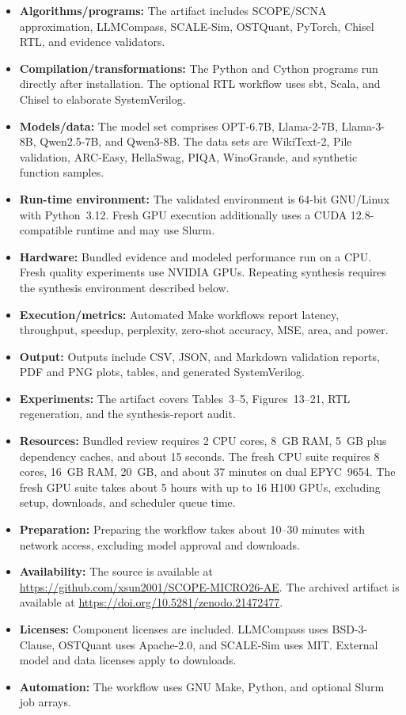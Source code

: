 \documentclass{sigplanconf}
\begin{document}
\begin{itemize}[leftmargin=*]
  \item \textbf{Algorithms/programs:} The artifact includes SCOPE/SCNA
    approximation, LLMCompass, SCALE-Sim, OSTQuant, PyTorch, Chisel RTL, and
    evidence validators.
  \item \textbf{Compilation/transformations:} The Python and Cython programs
    run directly after installation.  The optional RTL workflow uses sbt,
    Scala, and Chisel to elaborate SystemVerilog.
  \item \textbf{Models/data:} The model set comprises OPT-6.7B, Llama-2-7B,
    Llama-3-8B, Qwen2.5-7B, and Qwen3-8B.  The data sets are WikiText-2, Pile
    validation, ARC-Easy, HellaSwag, PIQA, WinoGrande, and synthetic function
    samples.
  \item \textbf{Run-time environment:} The validated environment is 64-bit
    GNU/Linux with Python~3.12.  Fresh GPU execution additionally uses a CUDA
    12.8-compatible runtime and may use Slurm.
  \item \textbf{Hardware:} Bundled evidence and modeled performance run on a
    CPU.  Fresh quality experiments use NVIDIA GPUs.  Repeating synthesis
    requires the synthesis environment described below.
  \item \textbf{Execution/metrics:} Automated Make workflows report latency,
    throughput, speedup, perplexity, zero-shot accuracy, MSE, area, and power.
  \item \textbf{Output:} Outputs include CSV, JSON, and Markdown validation
    reports, PDF and PNG plots, tables, and generated SystemVerilog.
  \item \textbf{Experiments:} The artifact covers Tables~3--5,
    Figures~13--21, RTL regeneration, and the synthesis-report audit.
  \item \textbf{Resources:} Bundled review requires 2 CPU cores, 8~GB RAM,
    5~GB plus dependency caches, and about 15 seconds.  The fresh CPU suite
    requires 8 cores, 16~GB RAM, 20~GB, and about 37 minutes on dual
    EPYC~9654.  The fresh GPU suite takes about 5 hours with up to 16 H100 GPUs,
    excluding setup, downloads, and scheduler queue time.
  \item \textbf{Preparation:} Preparing the workflow takes about 10--30
    minutes with network access, excluding model approval and downloads.
  \item \textbf{Availability:} The source is available at
    \url{https://github.com/xsun2001/SCOPE-MICRO26-AE}.  The archived artifact
    is available at \url{https://doi.org/10.5281/zenodo.21472477}.
  \item \textbf{Licenses:} Component licenses are included.  LLMCompass uses
    BSD-3-Clause, OSTQuant uses Apache-2.0, and SCALE-Sim uses MIT.  External
    model and data licenses apply to downloads.
  \item \textbf{Automation:} The workflow uses GNU Make, Python, and optional
    Slurm job arrays.
\end{itemize}
\end{document}
